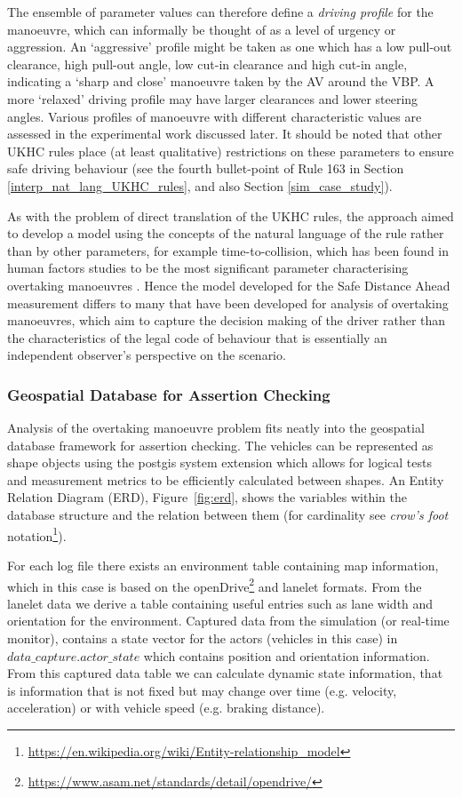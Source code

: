 The ensemble of parameter values can therefore define a \emph{driving profile} for the manoeuvre, which can informally be thought of as a level of urgency or aggression. An `aggressive' profile might be taken as one which has a low pull-out clearance, high pull-out angle, low cut-in clearance and high cut-in angle, indicating a `sharp and close' manoeuvre taken by the AV around the VBP. A more `relaxed' driving profile may have larger clearances and lower steering angles. Various profiles of manoeuvre with different characteristic values are assessed in the experimental work discussed later. It should be noted that other UKHC rules place (at least qualitative) restrictions on these parameters to ensure safe driving behaviour (see the fourth bullet-point of Rule 163 in Section \ref{interp_nat_lang_UKHC_rules}, and also Section \ref{sim_case_study}). 

As with the problem of direct translation of the UKHC rules, the approach aimed to develop a model using the concepts of the natural language of the rule rather than by other parameters, for example time-to-collision, which has been found in human factors studies to be the most significant parameter characterising overtaking manoeuvres \cite{lenard2018, Chen2015}. Hence the model developed for the Safe Distance Ahead measurement differs to many that have been developed for analysis of overtaking manoeuvres, which aim to capture the decision making of the driver rather than the characteristics of the legal code of behaviour that is essentially an independent observer's perspective on the scenario.

\subsubsection{Geospatial Database for Assertion Checking}
Analysis of the overtaking manoeuvre problem fits neatly into the geospatial database framework for assertion checking. The vehicles can be represented as shape objects using the postgis system extension which allows for logical tests and measurement metrics to be efficiently calculated between shapes. An Entity Relation Diagram (ERD), Figure~\ref{fig:erd}, shows the variables within the database structure and the relation between them (for cardinality see \textit{crow's foot} notation\footnote{\url{https://en.wikipedia.org/wiki/Entity-relationship\_model}}). 

For each log file there exists an environment table containing map information, which in this case is based on the openDrive\footnote{\url{https://www.asam.net/standards/detail/opendrive/}} and lanelet formats. From the lanelet data we derive a table containing useful entries such as lane width and orientation for the environment. Captured data from the simulation (or real-time monitor), contains a state vector for the actors (vehicles in this case) in $data\_capture.actor\_state$ which contains position and orientation information. From this captured data table we can calculate dynamic state information, that is information that is not fixed but may change over time (e.g. velocity, acceleration) or with vehicle speed (e.g. braking distance). 


